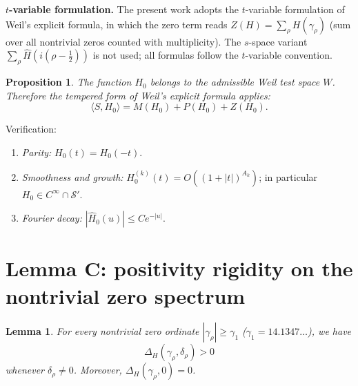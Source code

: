 \documentclass[11pt]{article}
\newtheorem{lemma}[theorem]{Lemma}
\newtheorem{proposition}[theorem]{Proposition}
\begin{document}
\noindent\textbf{$t$-variable formulation.} The present work adopts the
$t$-variable formulation of Weil's explicit formula, in which the zero
term reads $Z(H)=\sum_\rho H(\gamma_\rho)$ (sum over all nontrivial
zeros counted with multiplicity).  The $s$-space variant
$\sum_\rho\widehat H(i(\rho-\tfrac12))$ is not used; all formulas follow
the $t$-variable convention.

\begin{proposition}\label{prop:weil}
The function $H_0$ belongs to the admissible Weil test space $W$.
Therefore the tempered form of Weil's explicit formula applies:
\begin{equation}
\langle S,H_0\rangle=M(H_0)+P(H_0)+Z(H_0).
\end{equation}
\end{proposition}

\noindent Verification:
\begin{enumerate}
\item \emph{Parity:} $H_0(t)=H_0(-t)$.
\item \emph{Smoothness and growth:} $H_0^{(k)}(t)=O((1+|t|)^{A_k})$;
in particular $H_0\in C^\infty\cap\mathcal S'$.
\item \emph{Fourier decay:} $|\widehat H_0(u)|\le C e^{-|u|}$.
\end{enumerate}

\section{Lemma C: positivity rigidity on the nontrivial zero spectrum}

\begin{lemma}\label{lem:positivity}
For every nontrivial zero ordinate $|\gamma_\rho|\ge\gamma_1$
($\gamma_1=14.1347\ldots$), we have
\begin{equation}
\Delta_H(\gamma_\rho,\delta_\rho)>0
\end{equation}
whenever $\delta_\rho\ne 0$.  Moreover,
$\Delta_H(\gamma_\rho,0)=0$.
\end{lemma}
\end{document}
